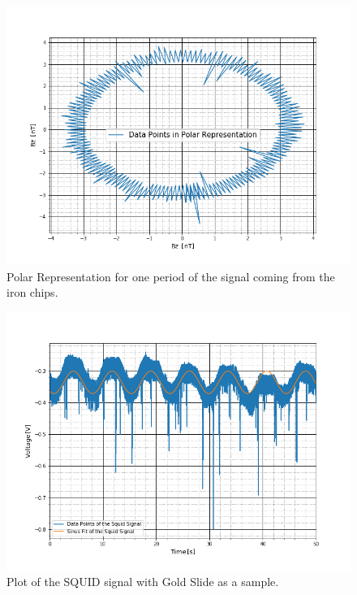 \begin{figure}[ht]
	\includegraphics[scale=0.5]{Bild/Eisenstaub}
	\centering
	\caption[Polar Representation for Iron Chips]{Polar Representation for one period of the signal coming from the iron chips.}
\end{figure}
\begin{figure}[ht]
	\includegraphics[scale=0.5]{Bild/P2_1}
	\centering
	\caption[SQUID signal of a Gold Slide 1]{Plot of the SQUID signal with Gold Slide as a sample.}
\end{figure}
